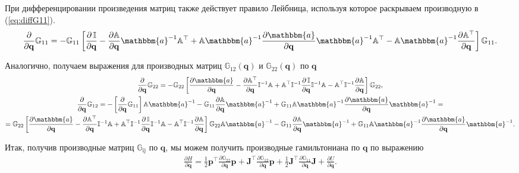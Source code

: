 \documentclass[12pt]{article}
\newcommand{\mf}{\mathbf}
\newcommand{\bbI}{\mathbb{I}}
\newcommand{\bba}{\mathbbm{a}}
\newcommand{\bbA}{\mathbb{A}}
\newcommand{\bbG}{\mathbb{G}}
\begin{document}
При дифференцировании произведения матриц также действует правило Лейбница, используя которое раскрываем производную в (\ref{eq:diffG11}).
\begin{gather}
	\frac{\partial}{\partial \mf{q}} \bbG_{11} = -\bbG_{11} \left[ \frac{\partial \, \bbI}{\partial \mf{q}} - \frac{\partial \bbA}{\partial \mf{q}} \bba^{-1} \bbA^\top + \bbA \bba^{-1} \frac{\partial \bba}{\partial \mf{q}} \bba^{-1} \bbA^\top - \bbA \bba^{-1} \frac{\partial \bbA^\top}{\partial \mf{q}} \right] \bbG_{11}. 
\end{gather}

Аналогично, получаем выражения для производных матриц $\bbG_{12}(\mf{q})$ и $\bbG_{22}(\mf{q})$ по $\mf{q}$
\begin{gather}
	\frac{\partial}{\partial \mf{q}} \bbG_{22} = -\bbG_{22} \left[ \frac{\partial \bba}{\partial \mf{q}} - \frac{\partial \bbA^\top}{\partial \mf{q}} \bbI^{-1} \bbA + \bbA^\top \bbI^{-1} \frac{\partial \, \bbI}{\partial \mf{q}} \bbI^{-1} \bbA - \bbA^\top \bbI^{-1} \frac{\partial \bbA}{\partial \mf{q}} \right] \bbG_{22}, \\
	\frac{\partial}{\partial \mf{q}} \bbG_{12} = - \left [ \frac{\partial}{\partial \mf{q}} \bbG_{11} \right] \bbA \bba^{-1} - \bbG_{11} \frac{\partial \bbA}{\partial \mf{q}} \bba^{-1} + \bbG_{11} \bbA \bba^{-1} \frac{\partial \bba}{\partial \mf{q}} \bba^{-1} = \\
	= \bbG_{22} \left[ \frac{\partial \bba}{\partial \mf{q}} - \frac{\partial \bbA^\top}{\partial \mf{q}} \bbI^{-1} \bbA + \bbA^\top \bbI^{-1} \frac{\partial \, \bbI}{\partial \mf{q}} \bbI^{-1} \bbA - \bbA^\top \bbI^{-1} \frac{\partial \bbA}{\partial \mf{q}} \right] \bbG_{22} \bbA \bba^{-1} - \bbG_{11} \frac{\partial \bbA}{\partial \mf{q}} \bba^{-1} + \bbG_{11} \bbA \bba^{-1} \frac{\partial \bba}{\partial \mf{q}} \bba^{-1}. 
\end{gather}

Итак, получив производные матриц $\bbG_\text{ij}$ по $\mf{q}$, мы можем получить производные гамильтониана по $\mf{q}$ по выражению
\begin{gather}
    \frac{\partial H}{\partial \mf{q}} = \frac{1}{2} \mf{p}^\top \frac{\partial \bbG_{22}}{\partial \mf{q}} \mf{p} + \mf{J}^\top \frac{\partial \bbG_{12}}{\partial \mf{q}} \mf{p} + \frac{1}{2} \mf{J}^\top \frac{\partial \bbG_{11}}{\partial \mf{q}} \mf{J} + \frac{\partial U}{\partial \mf{q}}.
\end{gather}
\end{document}

